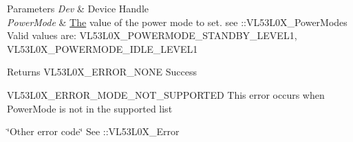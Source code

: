 \begin{DoxyParams}{Parameters}
{\em Dev} & Device Handle \\
\hline
{\em Power\+Mode} & \hyperlink{structThe}{The} value of the power mode to set. see \+::\+V\+L53\+L0\+X\+\_\+\+Power\+Modes Valid values are\+: V\+L53\+L0\+X\+\_\+\+P\+O\+W\+E\+R\+M\+O\+D\+E\+\_\+\+S\+T\+A\+N\+D\+B\+Y\+\_\+\+L\+E\+V\+E\+L1, V\+L53\+L0\+X\+\_\+\+P\+O\+W\+E\+R\+M\+O\+D\+E\+\_\+\+I\+D\+L\+E\+\_\+\+L\+E\+V\+E\+L1 \\
\hline
\end{DoxyParams}
\begin{DoxyReturn}{Returns}
V\+L53\+L0\+X\+\_\+\+E\+R\+R\+O\+R\+\_\+\+N\+O\+NE Success 

V\+L53\+L0\+X\+\_\+\+E\+R\+R\+O\+R\+\_\+\+M\+O\+D\+E\+\_\+\+N\+O\+T\+\_\+\+S\+U\+P\+P\+O\+R\+T\+ED This error occurs when Power\+Mode is not in the supported list 

\char`\"{}\+Other error code\char`\"{} See \+::\+V\+L53\+L0\+X\+\_\+\+Error 
\end{DoxyReturn}
